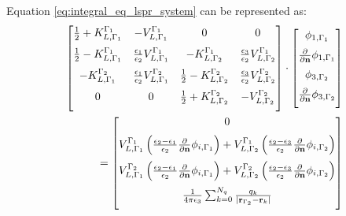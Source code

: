 %
Equation \eqref{eq:integral_eq_lspr_system} can be represented as:
%
\begin{align} \label{eq:matrix_multi}
 \left[
    \begin{matrix} 
       \frac{1}{2}+K_{L, \Gamma_1}^{\Gamma_1} & -V_{L, \Gamma_1}^{\Gamma_1} & 0 &  0   \vspace{0.2cm} \\
       \frac{1}{2}-K_{L, \Gamma_1}^{\Gamma_1} & \frac{\epsilon_1}{\epsilon_2} V_{L, \Gamma_1}^{\Gamma_1} & -K_{L, \Gamma_2}^{\Gamma_1} & \frac{\epsilon_3}{\epsilon_2} V_{L, \Gamma_2}^{\Gamma_1} \vspace{0.2cm}  \\
        -K_{L, \Gamma_1}^{\Gamma_2}&\frac{\epsilon_1}{\epsilon_2} V_{L, \Gamma_1}^{\Gamma_2} & \frac{1}{2}-K_{L, \Gamma_2}^{\Gamma_2}  &  \frac{\epsilon_3}{\epsilon_2} V_{L, \Gamma_2}^{\Gamma_2} \vspace{0.2cm} \\
       0 & 0 & \frac{1}{2}+K_{L, \Gamma_2}^{\Gamma_2}&  - V_{L, \Gamma_2}^{\Gamma_2}   \vspace{0.2cm} \\
    \end{matrix}
    \right] 
\cdot
 \left[
    \begin{matrix}
    \phi_{1,\Gamma_1} \vspace{0.2cm} \\
    \frac{\partial}{\partial \mathbf{n}} \phi_{1,\Gamma_1} \vspace{0.2cm} \\
    \phi_{3,\Gamma_2} \vspace{0.2cm} \\
    \frac{\partial}{\partial \mathbf{n}} \phi_{3,\Gamma_2} \vspace{0.2cm} \\
    \end{matrix}
\right]&
 \nonumber \\
 = \left[
    \begin{matrix}
    0 \vspace{0.2cm} \\
    V_{L,\Gamma_1}^{\Gamma_1} \left(\frac{\epsilon_2-\epsilon_1}{\epsilon_2}\frac{\partial}{\partial \mathbf{n}}\phi_{i,\Gamma_1} \right)
    + V_{L,\Gamma_2}^{\Gamma_1} \left(\frac{\epsilon_2 -\epsilon_3}{\epsilon_2}\frac{\partial}{\partial \mathbf{n}}\phi_{i,\Gamma_2} \right)
    \vspace{0.2cm}\\
    V_{L,\Gamma_1}^{\Gamma_2} \left(\frac{\epsilon_2-\epsilon_1}{\epsilon_2}\frac{\partial}{\partial \mathbf{n}}\phi_{i,\Gamma_1} \right)
    + V_{L,\Gamma_2}^{\Gamma_2} \left(\frac{\epsilon_2 -\epsilon_3}{\epsilon_2}\frac{\partial}{\partial \mathbf{n}}\phi_{i,\Gamma_2} \right)
    \vspace{0.2cm}\\
    \frac{1}{4\pi\epsilon_3}\sum_{k=0}^{N_q} \frac{q_k}{|\mathbf{r}_{\Gamma_2} - \mathbf{r}_k|} \vspace{0.2cm}  \\
    \end{matrix}
\right]&
\end{align}
